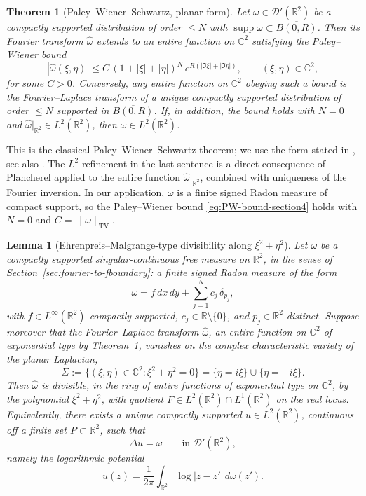 \documentclass[a4paper,11pt,reqno]{amsart}
\numberwithin{equation}{section}
\theoremstyle{plain} %
\newtheorem{lemma}{Lemma}[section]
\newtheorem{theorem}{Theorem}
\theoremstyle{definition} %
\theoremstyle{remark}
\newcommand{\R}{\mathbb{R}}
\newcommand{\C}{\mathbb{C}}
\begin{document}
\begin{theorem}[Paley--Wiener--Schwartz, planar form]\label{thm:PW-section4}
Let $\omega\in\mathcal D'(\R^2)$ be a compactly supported distribution of
order $\le N$ with $\operatorname{supp}\omega\subset \overline{B(0,R)}$.
Then its Fourier transform $\widehat\omega$ extends to an entire function
on $\C^2$ satisfying the Paley--Wiener bound
\begin{equation}\label{eq:PW-bound-section4}
|\widehat\omega(\xi,\eta)|\le C\,(1+|\xi|+|\eta|)^N\,e^{R(|\Im\xi|+|\Im\eta|)},
\qquad (\xi,\eta)\in\C^2,
\end{equation}
for some $C>0$. Conversely, any entire function on $\C^2$ obeying such a
bound is the Fourier--Laplace transform of a unique compactly supported
distribution of order $\le N$ supported in $\overline{B(0,R)}$. If, in
addition, the bound holds with $N=0$ and $\widehat\omega|_{\R^2}\in
L^2(\R^2)$, then $\omega\in L^2(\R^2)$.
\end{theorem}

This is the classical Paley--Wiener--Schwartz theorem; we use the form
stated in \cite[Theorem~7.3.1]{Hormander}, see also \cite[\S 9.3]{Folland}.
The $L^2$ refinement in the last sentence is a direct consequence of
Plancherel applied to the entire function $\widehat\omega|_{\R^2}$, combined
with uniqueness of the Fourier inversion. In our application, $\omega$ is
a finite signed Radon measure of compact support, so the Paley--Wiener
bound \eqref{eq:PW-bound-section4} holds with $N=0$ and $C=\|\omega\|_{\mathrm{TV}}$.

\begin{lemma}[Ehrenpreis--Malgrange-type divisibility along $\xi^2+\eta^2$]\label{lem:EM-section4}
Let $\omega$ be a compactly supported singular-continuous free measure on
$\R^2$, in the sense of Section~\ref{sec:fourier-to-fboundary}: a finite
signed Radon measure of the form
\[
\omega=f\,dx\,dy+\sum_{j=1}^N c_j\,\delta_{p_j},
\]
with $f\in L^\infty(\R^2)$ compactly supported, $c_j\in\R\setminus\{0\}$,
and $p_j\in\R^2$ distinct. Suppose moreover that the Fourier--Laplace
transform $\widehat\omega$, an entire function on $\C^2$ of exponential
type by Theorem~\ref{thm:PW-section4}, vanishes on the complex
characteristic variety of the planar Laplacian,
\begin{equation}\label{eq:complex-char-variety}
\Sigma:=\{(\xi,\eta)\in\C^2:\xi^2+\eta^2=0\}=\{\eta=i\xi\}\cup\{\eta=-i\xi\}.
\end{equation}
Then $\widehat\omega$ is divisible, in the ring of entire functions of
exponential type on $\C^2$, by the polynomial $\xi^2+\eta^2$, with quotient
$F\in L^2(\R^2)\cap L^1(\R^2)$ on the real locus. Equivalently, there
exists a unique compactly supported $u\in L^2(\R^2)$, continuous off a
finite set $P\subset\R^2$, such that
\[
\Delta u=\omega\qquad\text{in }\mathcal D'(\R^2),
\]
namely the logarithmic potential
\[
u(z)=\frac{1}{2\pi}\int_{\R^2}\log|z-z'|\,d\omega(z').
\]
\end{lemma}
\end{document}
